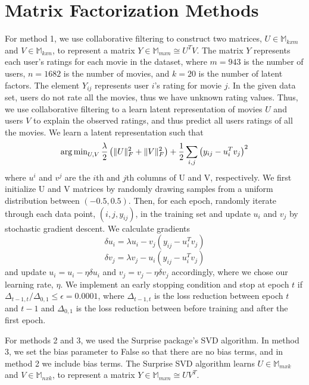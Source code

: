 \documentclass{article}
\begin{document}
\section{Matrix Factorization Methods}
For method 1, we use collaborative filtering to construct two matrices, $U \in \mathbb{M}_{k x m}$ and $V \in \mathbb{M}_{k x n}$, to represent a matrix $Y \in \mathbb{M}_{m x n} \cong U^TV$. The matrix $Y$ represents each user's ratings for each movie in the dataset, where $m = 943$ is the number of users, $n = 1682$ is the number of movies, and $k=20$ is the number of latent factors. The element $Y_{ij}$ represents user $i$'s rating for movie $j$. In the given data set, users do not rate all the movies, thus we have unknown rating values. Thus, we use collaborative filtering to a learn latent representation of movies $U$ and users $V$ to explain the observed ratings, and thus predict all users ratings of all the movies.
We learn a latent representation such that $$\operatorname{arg\,min}_{U,V} \frac{\lambda}{2} \left( \|U\|_F^2 + \|V\|^2_F \right) + \frac{1}{2}\sum_{i,j} \left( y_{ij} - u_{i}^Tv_j\right)^2$$ where $u^i$ and $v^j$ are the $i$th and $j$th columns of U and V, respectively. We first initialize U and V matrices by randomly drawing samples from a uniform distribution between $(-0.5,0.5)$. Then, for each epoch, randomly iterate through each data point, $(i, j, y_{ij})$, in the training set and update $u_i$ and $v_j$ by stochastic gradient descent. We calculate gradients 
$$\delta{u_i} = \lambda u_i - v_j(y_{ij} - u_i^Tv_j)$$
$$\delta{v_j} = \lambda v_j - u_i(y_{ij} - u_i^Tv_j)$$ and update $u_i = u_i - \eta \delta{u_i}$ and $v_j = v_j - \eta \delta{v_j}$ accordingly, where we chose our learning rate, $\eta$. We implement an early stopping condition and stop at epoch $t$ if $\Delta_{t-1,t} / \Delta_{0,1} \leq \epsilon = 0.0001$, where $\Delta_{t-1,t}$ is the loss reduction between epoch $t$ and $t-1$ and $\Delta_{0,1}$ is the loss reduction between before training and after the first epoch.

For methods 2 and 3, we used the Surprise package's SVD algorithm. In method 3, we set the bias parameter to False so that there are no bias terms, and in method 2 we include bias terms. The Surprise SVD algorithm learns $U \in \mathbb{M}_{m x k}$ and $V \in \mathbb{M}_{n x k}$, to represent a matrix $Y \in \mathbb{M}_{m x n} \cong UV^T$. \\
\end{document}
